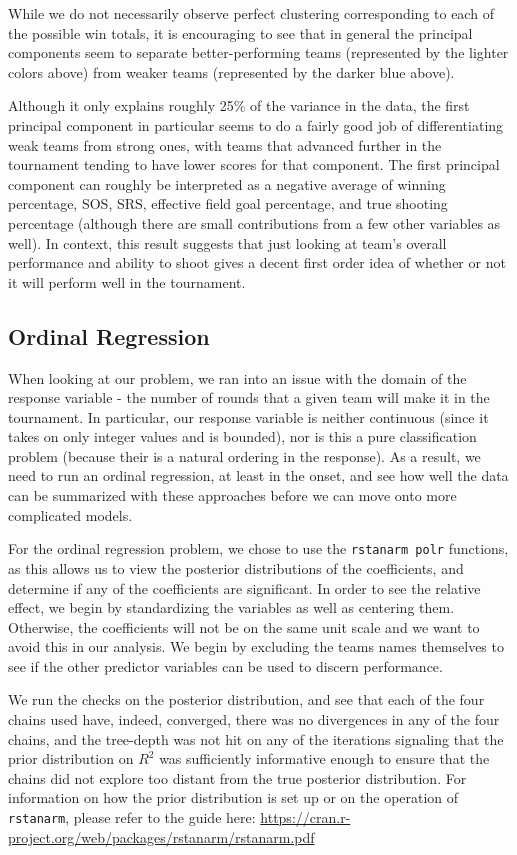 \documentclass[10pt,a4paper, hidelinks]{article} %
\begin{document}
While we do not necessarily observe perfect clustering corresponding to each of the possible win totals, it is encouraging to see that in general the principal components seem to separate better-performing teams (represented by the lighter colors above) from weaker teams (represented by the darker blue above). 

Although it only explains roughly 25\% of the variance in the data, the first principal component in particular seems to do a fairly good job of differentiating weak teams from strong ones, with teams that advanced further in the tournament tending to have lower scores for that component. The first principal component can roughly be interpreted as a negative average of winning percentage, SOS, SRS, effective field goal percentage, and true shooting percentage (although there are small contributions from a few other variables as well). In context, this result suggests that just looking at team's overall performance and ability to shoot gives a decent first order idea of whether or not it will perform well in the tournament.

\subsection{Ordinal Regression}

When looking at our problem, we ran into an issue with the domain of the response variable - the number of rounds that a given team will make it in the tournament. In particular, our response variable is neither continuous (since it takes on only integer values and is bounded), nor is this a pure classification problem (because their is a natural ordering in the response). As a result, we need to run an ordinal regression, at least in the onset, and see how well the data can be summarized with these approaches before we can move onto more complicated models. 

For the ordinal regression problem, we chose to use the \texttt{rstanarm polr} functions, as this allows us to view the posterior distributions of the coefficients, and determine if any of the coefficients are significant. In order to see the relative effect, we begin by standardizing the variables as well as centering them. Otherwise, the coefficients will not be on the same unit scale and we want to avoid this in our analysis. We begin by excluding the teams names themselves to see if the other predictor variables can be used to discern performance. 

We run the checks on the posterior distribution, and see that each of the four chains used have, indeed, converged, there was no divergences in any of the four chains, and the tree-depth was not hit on any of the iterations signaling that the prior distribution on $R^2$ was sufficiently informative enough to ensure that the chains did not explore too distant from the true posterior distribution. For information on how the prior distribution is set up or on the operation of \texttt{rstanarm}, please refer to the guide here: {\color{blue} \url{https://cran.r-project.org/web/packages/rstanarm/rstanarm.pdf}}
\end{document}
